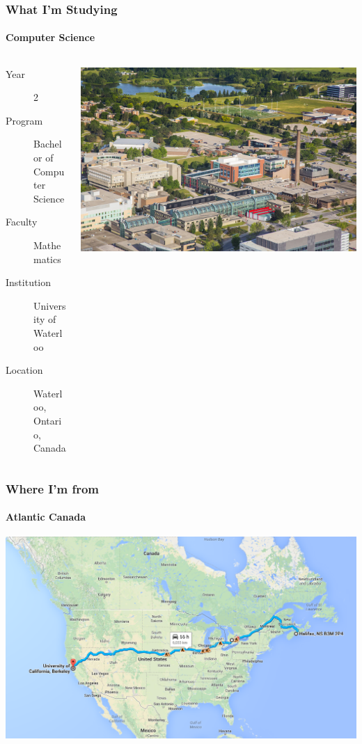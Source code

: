 \documentclass[mathserif, aspectratio=169]{beamer}
\begin{document}
\begin{frame}

\frametitle{What I'm Studying}
\framesubtitle{Computer Science}

\begin{columns}
\begin{column}{.7\textwidth}
\begin{description}
\item[Year] 2
\item[Program] Bachelor of Computer Science
\item[Faculty] Mathematics
\item[Institution] University of Waterloo
\item[Location] Waterloo, Ontario, Canada
\end{description}
\end{column}
\begin{column}{.3\textwidth}
\includegraphics[width=1.0\linewidth]{images/campus.jpg}
\end{column}
\end{columns}

\end{frame}


\begin{frame}
\frametitle{Where I'm from}
\framesubtitle{Atlantic Canada}
\centering
\includegraphics[height=.75\textheight]{images/map.png}
\end{frame}
\end{document}
